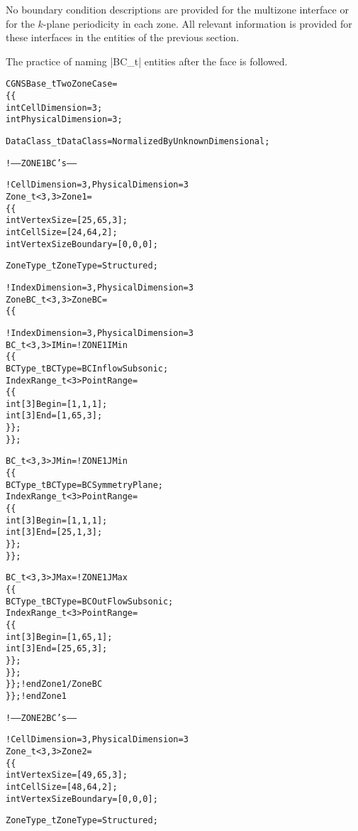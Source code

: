 No boundary condition descriptions are provided for the multizone
interface or for the $k$-plane periodicity in each zone.  All
relevant information is provided for these interfaces in the
 entities of the previous section.

The practice of naming |BC_t| entities after the face is followed.
\begin{alltt}
CGNSBase\_t TwoZoneCase =
  \{\{
  int CellDimension = 3 ;
  int PhysicalDimension = 3 ;

  DataClass\_t DataClass = NormalizedByUnknownDimensional ;

  !  -----  ZONE 1 BC's  ------

  !  CellDimension = 3, PhysicalDimension = 3
  Zone\_t<3,3> Zone1 =
    \{\{
    int VertexSize = [25,65,3] ;
    int CellSize   = [24,64,2] ;
    int VertexSizeBoundary = [0,0,0];

    ZoneType\_t ZoneType = Structured;

    !  IndexDimension = 3, PhysicalDimension = 3
    ZoneBC\_t<3,3> ZoneBC =
      \{\{
 
      !  IndexDimension = 3, PhysicalDimension = 3
      BC\_t<3,3> IMin =                                  !  ZONE 1 IMin
        \{\{
        BCType\_t BCType = BCInflowSubsonic ;
        IndexRange\_t<3> PointRange = 
          \{\{
          int[3] Begin = [1,1 ,1] ;
          int[3] End   = [1,65,3] ;
          \}\} ;
        \}\} ;

      BC\_t<3,3> JMin =                                  !  ZONE 1 JMin
        \{\{
        BCType\_t BCType = BCSymmetryPlane ;
        IndexRange\_t<3> PointRange = 
          \{\{
          int[3] Begin = [1 ,1,1] ;
          int[3] End   = [25,1,3] ;
          \}\} ;
        \}\} ;

      BC\_t<3,3> JMax =                                  !  ZONE 1 JMax
        \{\{
        BCType\_t BCType = BCOutFlowSubsonic ;
        IndexRange\_t<3> PointRange = 
          \{\{
          int[3] Begin = [1 ,65,1] ;
          int[3] End   = [25,65,3] ;
          \}\} ;
        \}\} ;
      \}\} ;      ! end Zone1/ZoneBC
    \}\} ;        ! end Zone1
    
 
  !  -----  ZONE 2 BC's  ------

  !  CellDimension = 3, PhysicalDimension = 3
  Zone\_t<3,3> Zone2 =
    \{\{
    int VertexSize = [49,65,3] ;
    int CellSize   = [48,64,2] ;
    int VertexSizeBoundary = [0,0,0];

    ZoneType\_t ZoneType = Structured;


\end{alltt}
